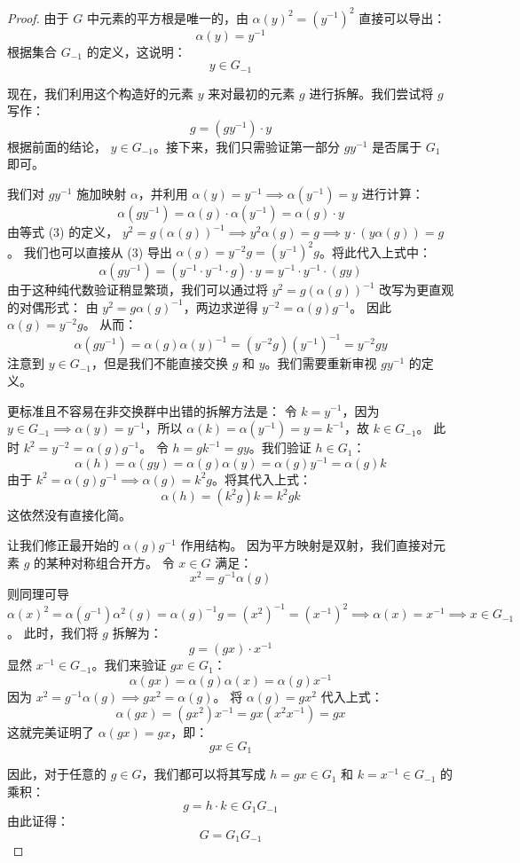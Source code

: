 \documentclass[]{article}
\begin{document}
\begin{proof}
由于 $G$ 中元素的平方根是唯一的，由 $\alpha(y)^2 = (y^{-1})^2$ 直接可以导出：
\[ \alpha(y) = y^{-1} \]
根据集合 $G_{-1}$ 的定义，这说明：
\[ y \in G_{-1} \]

现在，我们利用这个构造好的元素 $y$ 来对最初的元素 $g$ 进行拆解。我们尝试将 $g$ 写作：
\[ g = (gy^{-1}) \cdot y \]
根据前面的结论， $y \in G_{-1}$。接下来，我们只需验证第一部分 $gy^{-1}$ 是否属于 $G_1$ 即可。

我们对 $gy^{-1}$ 施加映射 $\alpha$，并利用 $\alpha(y) = y^{-1} \implies \alpha(y^{-1}) = y$ 进行计算：
\[ \alpha(gy^{-1}) = \alpha(g) \cdot \alpha(y^{-1}) = \alpha(g) \cdot y \]
由等式 (3) 的定义， $y^2 = g(\alpha(g))^{-1} \implies y^2 \alpha(g) = g \implies y \cdot (y\alpha(g)) = g$。
我们也可以直接从 (3) 导出 $\alpha(g) = y^{-2}g = (y^{-1})^2 g$。将此代入上式中：
\[ \alpha(gy^{-1}) = (y^{-1} \cdot y^{-1} \cdot g) \cdot y = y^{-1} \cdot y^{-1} \cdot (gy) \]
由于这种纯代数验证稍显繁琐，我们可以通过将 $y^2 = g(\alpha(g))^{-1}$ 改写为更直观的对偶形式：
由 $y^2 = g\alpha(g)^{-1}$，两边求逆得 $y^{-2} = \alpha(g)g^{-1}$。
因此 $\alpha(g) = y^{-2}g$。
从而：
\[ \alpha(gy^{-1}) = \alpha(g)\alpha(y)^{-1} = (y^{-2}g)(y^{-1})^{-1} = y^{-2}gy \]
注意到 $y \in G_{-1}$，但是我们不能直接交换 $g$ 和 $y$。我们需要重新审视 $gy^{-1}$ 的定义。

更标准且不容易在非交换群中出错的拆解方法是：
令 $k = y^{-1}$，因为 $y \in G_{-1} \implies \alpha(y) = y^{-1}$，所以 $\alpha(k) = \alpha(y^{-1}) = y = k^{-1}$，故 $k \in G_{-1}$。
此时 $k^2 = y^{-2} = \alpha(g)g^{-1}$。
令 $h = gk^{-1} = gy$。我们验证 $h \in G_1$：
\[ \alpha(h) = \alpha(gy) = \alpha(g)\alpha(y) = \alpha(g)y^{-1} = \alpha(g)k \]
由于 $k^2 = \alpha(g)g^{-1} \implies \alpha(g) = k^2g$。将其代入上式：
\[ \alpha(h) = (k^2g)k = k^2gk \]
这依然没有直接化简。

让我们修正最开始的 $\alpha(g)g^{-1}$ 作用结构。
因为平方映射是双射，我们直接对元素 $g$ 的某种对称组合开方。
令 $x \in G$ 满足：
\[ x^2 = g^{-1}\alpha(g) \]
则同理可导 $\alpha(x)^2 = \alpha(g^{-1})\alpha^2(g) = \alpha(g)^{-1}g = (x^2)^{-1} = (x^{-1})^2 \implies \alpha(x) = x^{-1} \implies x \in G_{-1}$。
此时，我们将 $g$ 拆解为：
\[ g = (gx) \cdot x^{-1} \]
显然 $x^{-1} \in G_{-1}$。我们来验证 $gx \in G_1$：
\[ \alpha(gx) = \alpha(g)\alpha(x) = \alpha(g)x^{-1} \]
因为 $x^2 = g^{-1}\alpha(g) \implies g x^2 = \alpha(g)$。
将 $\alpha(g) = gx^2$ 代入上式：
\[ \alpha(gx) = (gx^2)x^{-1} = gx(x^2 x^{-1}) = gx \]
这就完美证明了 $\alpha(gx) = gx$，即：
\[ gx \in G_1 \]

因此，对于任意的 $g \in G$，我们都可以将其写成 $h = gx \in G_1$ 和 $k = x^{-1} \in G_{-1}$ 的乘积：
\[ g = h \cdot k \in G_1 G_{-1} \]
由此证得：
\[ G = G_1 G_{-1} \]


\end{proof}
\end{document}
